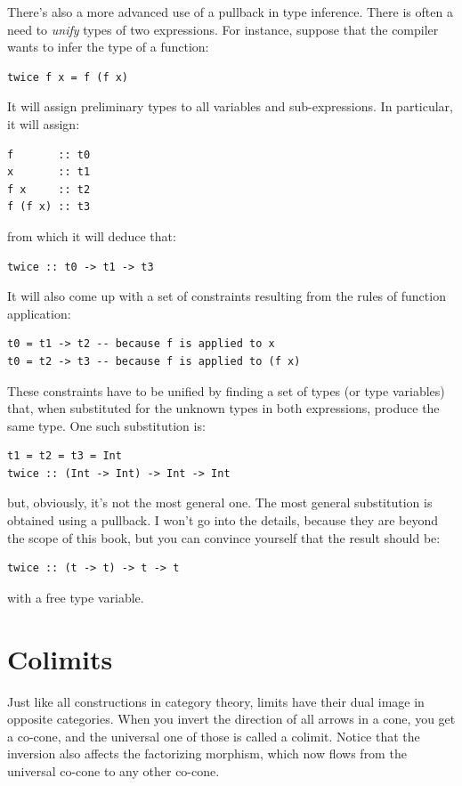 \noindent
There's also a more advanced use of a pullback in type inference. There
is often a need to \emph{unify} types of two expressions. For instance,
suppose that the compiler wants to infer the type of a function:

\begin{Verbatim}
twice f x = f (f x)
\end{Verbatim}
It will assign preliminary types to all variables and sub-expressions.
In particular, it will assign:

\begin{Verbatim}
f       :: t0
x       :: t1
f x     :: t2
f (f x) :: t3
\end{Verbatim}
from which it will deduce that:

\begin{Verbatim}
twice :: t0 -> t1 -> t3
\end{Verbatim}
It will also come up with a set of constraints resulting from the rules
of function application:

\begin{Verbatim}
t0 = t1 -> t2 -- because f is applied to x 
t0 = t2 -> t3 -- because f is applied to (f x)
\end{Verbatim}
These constraints have to be unified by finding a set of types (or type
variables) that, when substituted for the unknown types in both
expressions, produce the same type. One such substitution is:

\begin{Verbatim}
t1 = t2 = t3 = Int 
twice :: (Int -> Int) -> Int -> Int
\end{Verbatim}
but, obviously, it's not the most general one. The most general
substitution is obtained using a pullback. I won't go into the details,
because they are beyond the scope of this book, but you can convince
yourself that the result should be:

\begin{Verbatim}
twice :: (t -> t) -> t -> t
\end{Verbatim}
with  a free type variable.

\section{Colimits}\label{colimits}

Just like all constructions in category theory, limits have their dual
image in opposite categories. When you invert the direction of all
arrows in a cone, you get a co-cone, and the universal one of those is
called a colimit. Notice that the inversion also affects the factorizing
morphism, which now flows from the universal co-cone to any other
co-cone.

